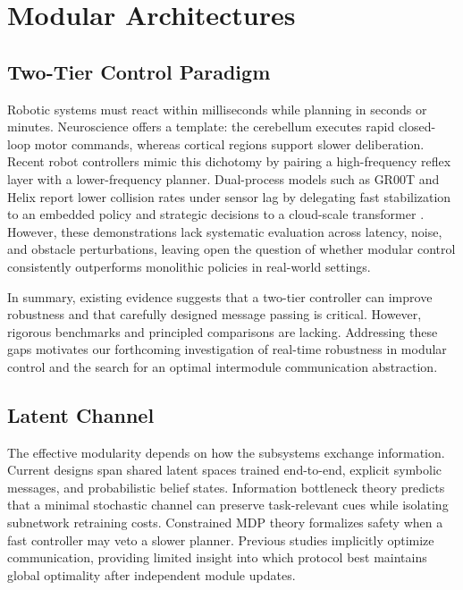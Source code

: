 \chapter{Modular Architectures}
\label{sec:modular_architectures}

\section{Two-Tier Control Paradigm}
Robotic systems must react within milliseconds while planning in seconds or minutes. Neuroscience offers a template: the cerebellum executes rapid closed-loop motor commands, whereas cortical regions support slower deliberation. Recent robot controllers mimic this dichotomy by pairing a high-frequency reflex layer with a lower-frequency planner. Dual-process models such as GR00T and Helix report lower collision rates under sensor lag by delegating fast stabilization to an embedded policy and strategic decisions to a cloud-scale transformer \cite{GR00T2025, HELIX2025}. However, these demonstrations lack systematic evaluation across latency, noise, and obstacle perturbations, leaving open the question of whether modular control consistently outperforms monolithic policies in real-world settings.

In summary, existing evidence suggests that a two-tier controller can improve robustness and that carefully designed message passing is critical. However, rigorous benchmarks and principled comparisons are lacking. Addressing these gaps motivates our forthcoming investigation of real-time robustness in modular control and the search for an optimal intermodule communication abstraction.

\section{Latent Channel}
The effective modularity depends on how the subsystems exchange information. Current designs span shared latent spaces trained end-to-end, explicit symbolic messages, and probabilistic belief states. Information bottleneck theory predicts that a minimal stochastic channel can preserve task-relevant cues while isolating subnetwork retraining costs. Constrained \ac{MDP} theory formalizes safety when a fast controller may veto a slower planner. Previous studies implicitly optimize communication, providing limited insight into which protocol best maintains global optimality after independent module updates.